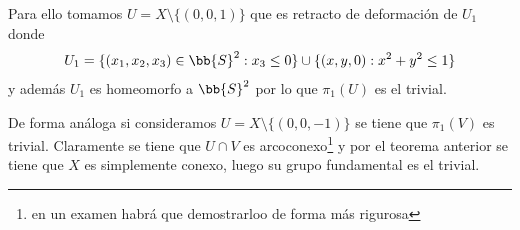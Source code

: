\begin{ejemplo}
\begin{enumerate}
        \begin{figure}[H]
            \centering
        \end{figure}

        Para ello tomamos $U=X\setminus \{(0,0,1)\}$ que es retracto de deformación de $U_1$ donde
        \begin{gather*}
            U_1 = \{(x_1,x_2,x_3)\in \bb{S}^2 : x_3 \leq 0\}\cup \{(x,y,0) : x^2 + y^2 \leq 1\}
        \end{gather*}
        y además $U_1$ es homeomorfo a $\bb{S}^2$ por lo que $\pi_1(U)$ es el trivial. 
        
        \begin{figure}[H]
            \centering
        \end{figure}
        
        De forma análoga si consideramos $U=X\setminus \{(0,0,-1)\}$ se tiene que $\pi_1(V)$ es trivial. Claramente se tiene que $U\cap V$ es arcoconexo\footnote{en un examen habrá que demostrarloo de forma más rigurosa} y por el teorema anterior se tiene que $X$ es simplemente conexo, luego su grupo fundamental es el trivial.
    \end{enumerate}
\end{ejemplo}


